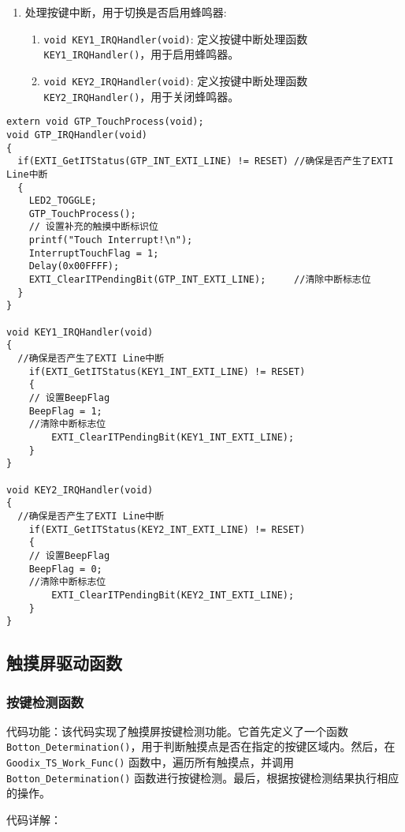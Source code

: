 \documentclass{theme-2639013-final}
\begin{document}
\begin{enumerate}
  \item 处理按键中断，用于切换是否启用蜂鸣器:
    \begin{enumerate}
      \item \texttt{void KEY1\_IRQHandler(void)}: 定义按键中断处理函数 \texttt{KEY1\_IRQHandler()}，用于启用蜂鸣器。
      \item \texttt{void KEY2\_IRQHandler(void)}: 定义按键中断处理函数 \texttt{KEY2\_IRQHandler()}，用于关闭蜂鸣器。
    \end{enumerate}
\end{enumerate}

\begin{verbatim}
extern void GTP_TouchProcess(void);
void GTP_IRQHandler(void)
{
  if(EXTI_GetITStatus(GTP_INT_EXTI_LINE) != RESET) //确保是否产生了EXTI Line中断
  {
    LED2_TOGGLE;
    GTP_TouchProcess();
    // 设置补充的触摸中断标识位
    printf("Touch Interrupt!\n");
    InterruptTouchFlag = 1;
    Delay(0x00FFFF);
    EXTI_ClearITPendingBit(GTP_INT_EXTI_LINE);     //清除中断标志位
  }  
}

void KEY1_IRQHandler(void)
{
  //确保是否产生了EXTI Line中断
	if(EXTI_GetITStatus(KEY1_INT_EXTI_LINE) != RESET) 
	{
    // 设置BeepFlag
    BeepFlag = 1;
    //清除中断标志位
		EXTI_ClearITPendingBit(KEY1_INT_EXTI_LINE);     
	}  
}

void KEY2_IRQHandler(void)
{
  //确保是否产生了EXTI Line中断
	if(EXTI_GetITStatus(KEY2_INT_EXTI_LINE) != RESET) 
	{
    // 设置BeepFlag
    BeepFlag = 0;
    //清除中断标志位
		EXTI_ClearITPendingBit(KEY2_INT_EXTI_LINE);     
	}  
}
\end{verbatim}

\subsection{触摸屏驱动函数}

\subsubsection{按键检测函数}

代码功能：该代码实现了触摸屏按键检测功能。它首先定义了一个函数 \texttt{Botton\_Determination()}，用于判断触摸点是否在指定的按键区域内。然后，在 \texttt{Goodix\_TS\_Work\_Func()} 函数中，遍历所有触摸点，并调用 \texttt{Botton\_Determination()} 函数进行按键检测。最后，根据按键检测结果执行相应的操作。

代码详解：
\end{document}
